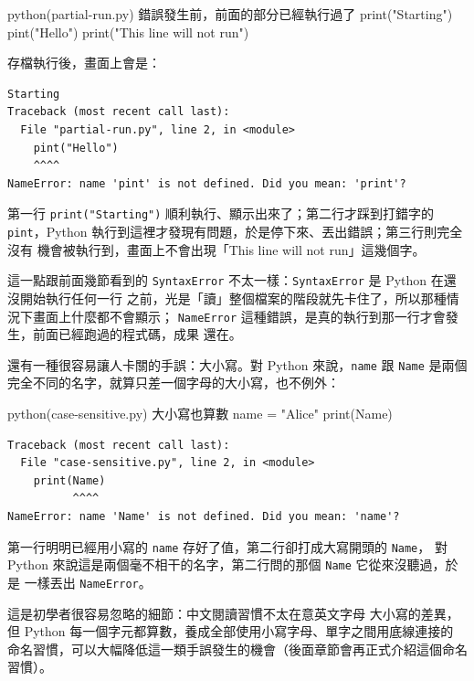 \begin{example}{python}{(partial-run.py) 錯誤發生前，前面的部分已經執行過了}
print("Starting")
pint("Hello")
print("This line will not run")
\end{example}

存檔執行後，畫面上會是：

\begin{verbatim}
Starting
Traceback (most recent call last):
  File "partial-run.py", line 2, in <module>
    pint("Hello")
    ^^^^
NameError: name 'pint' is not defined. Did you mean: 'print'?
\end{verbatim}

第一行 \texttt{print("Starting")} 順利執行、顯示出來了；第二行才踩到打錯字的
\texttt{pint}，Python 執行到這裡才發現有問題，於是停下來、丟出錯誤；第三行則完全沒有
機會被執行到，畫面上不會出現「This line will not run」這幾個字。

這一點跟前面幾節看到的
\texttt{SyntaxError} 不太一樣：\texttt{SyntaxError} 是 Python 在還沒開始執行任何一行
之前，光是「讀」整個檔案的階段就先卡住了，所以那種情況下畫面上什麼都不會顯示；
\texttt{NameError} 這種錯誤，是真的執行到那一行才會發生，前面已經跑過的程式碼，成果
還在。


還有一種很容易讓人卡關的手誤：大小寫。對 Python 來說，\texttt{name} 跟 \texttt{Name}
是兩個完全不同的名字，就算只差一個字母的大小寫，也不例外：

\begin{example}{python}{(case-sensitive.py) 大小寫也算數}
name = "Alice"
print(Name)
\end{example}

\begin{verbatim}
Traceback (most recent call last):
  File "case-sensitive.py", line 2, in <module>
    print(Name)
          ^^^^
NameError: name 'Name' is not defined. Did you mean: 'name'?
\end{verbatim}

第一行明明已經用小寫的 \texttt{name} 存好了值，第二行卻打成大寫開頭的 \texttt{Name}，
對 Python 來說這是兩個毫不相干的名字，第二行問的那個 \texttt{Name} 它從來沒聽過，於是
一樣丟出 \texttt{NameError}。

這是初學者很容易忽略的細節：中文閱讀習慣不太在意英文字母
大小寫的差異，但 Python 每一個字元都算數，養成全部使用小寫字母、單字之間用底線連接的
命名習慣，可以大幅降低這一類手誤發生的機會（後面章節會再正式介紹這個命名習慣）。

